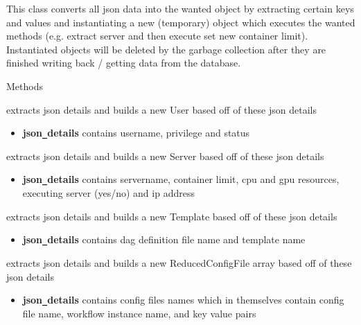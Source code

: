 This class converts all json data into the wanted object by extracting certain keys and values and instantiating
a new (temporary) object which executes the wanted methods (e.g. extract server and then execute set new container limit).
Instantiated objects will be deleted by the garbage collection after they are finished writing back / getting data
from the database.

\begin{methodenv}{Methods}

extracts json details and builds a new User based off of these json details
\begin{itemize}
        \item \textbf{json\texttt{\_}details}
        contains username, privilege and status
\end{itemize}

extracts json details and builds a new Server based off of these json details
\begin{itemize}
        \item \textbf{json\texttt{\_}details}
        contains servername, container limit, cpu and gpu resources, executing server (yes/no) and ip address
\end{itemize}

extracts json details and builds a new Template based off of these json details
\begin{itemize}
        \item \textbf{json\texttt{\_}details}
        contains dag definition file name and template name
\end{itemize}

extracts json details and builds a new ReducedConfigFile array based off of these json details
\begin{itemize}
        \item \textbf{json\texttt{\_}details}
        contains config files names which in themselves contain config file name, workflow instance name,
        and key value pairs
\end{itemize}

\end{methodenv}

